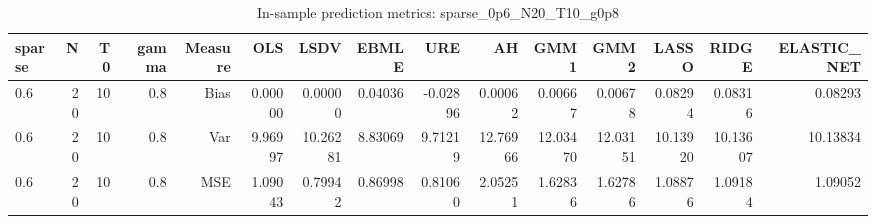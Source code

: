 \begin{table}[!htbp]\centering
\caption{In-sample prediction metrics: sparse_0p6_N20_T10_g0p8}
\label{tab:table2_sparse_0p6_N20_T10_g0p8}
\begin{tabular}{lrrrrrrrrrrrrrr}
\hline
sparse & N & T0 & gamma & Measure & OLS & LSDV & EBMLE & URE & AH & GMM1 & GMM2 & LASSO & RIDGE & ELASTIC_NET \\
\hline
0.6 & 20 & 10 & 0.8 & Bias & 0.00000 & 0.00000 & 0.04036 & -0.02896 & 0.00062 & 0.00667 & 0.00678 & 0.08294 & 0.08316 & 0.08293 \\
0.6 & 20 & 10 & 0.8 & Var & 9.96997 & 10.26281 & 8.83069 & 9.71219 & 12.76966 & 12.03470 & 12.03151 & 10.13920 & 10.13607 & 10.13834 \\
0.6 & 20 & 10 & 0.8 & MSE & 1.09043 & 0.79942 & 0.86998 & 0.81060 & 2.05251 & 1.62836 & 1.62786 & 1.08876 & 1.09184 & 1.09052 \\
\hline
\end{tabular}
\end{table}

